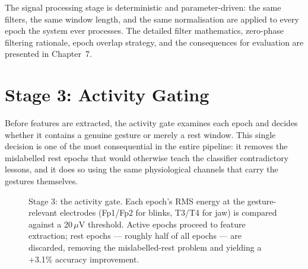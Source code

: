 The signal processing stage is deterministic and parameter-driven:
the same filters, the same window length, and the same normalisation
are applied to every epoch the system ever processes. The detailed
filter mathematics, zero-phase filtering rationale, epoch overlap
strategy, and the consequences for evaluation are presented in
Chapter~7.

\section{Stage 3: Activity Gating}
\label{sec:mo_gating}

Before features are extracted, the activity gate examines each
epoch and decides whether it contains a genuine gesture or merely a
rest window. This single decision is one of the most consequential
in the entire pipeline: it removes the mislabelled rest epochs that
would otherwise teach the classifier contradictory lessons, and it
does so using the same physiological channels that carry the
gestures themselves.

\begin{figure}[htbp]
\centering
{}
\caption{Stage 3: the activity gate. Each epoch's RMS energy at the
gesture-relevant electrodes (Fp1/Fp2 for blinks, T3/T4 for jaw) is
compared against a 20\,$\mu$V threshold. Active epochs proceed to
feature extraction; rest epochs --- roughly half of all epochs ---
are discarded, removing the mislabelled-rest problem and yielding a
+3.1\% accuracy improvement.}
\label{fig:mo_gating}
\end{figure}

